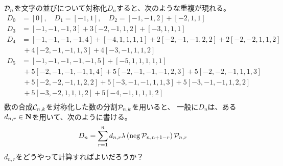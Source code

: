 {\begin{todo}[符号の対称化]\label{todo:符号の対称化} %
	${\mathcal{D}}_n$を文字の並びについて対称化$D_n$すると、次のような重複が現れる。
	\begin{equation*}\begin{split}
D_0 &= [0],\quad D_1 = [-1, 1],\quad D_2 = [-1, -1, 2] + [-2, 1, 1] \\
D_3 &= [-1, -1, -1, 3] + 3[-2, -1, 1, 2] + [-3, 1, 1, 1] \\
D_4 &= [-1, -1, -1, -1, 4] + [-4, 1, 1, 1, 1]
	+ 2[-2, -1, -1, 2, 2] + 2[-2, -2, 1, 1, 2] \\
&\,+ 4[-2, -1, -1, 1, 3] + 4[-3, -1, 1, 1, 2] \\
D_5 &= [-1, -1, -1, -1, -1, 5] + [-5, 1, 1, 1, 1, 1] \\
&\,+ 5[-2, -1, -1, -1, 1, 4] + 5[-2, -1, -1, -1, 2, 3] + 5[-2, -2, -1, 1, 1, 3] \\
&\,+ 5[-2, -2, -1, 1, 2, 2] + 5[-3, -1, -1, 1, 1, 3] + 5[-3, -1, -1, 1, 2, 2] \\
&\,+ 5[-3, -2, 1, 1, 1, 2] + 5[-4, -1, 1, 1, 1, 2] \\
	\end{split}\end{equation*}
	数の合成${\mathcal{C}}_{n,k}$を対称化した数の分割${\mathcal{P}}_{n,k}$を用いると、
	一般に$D_n$は、ある$d_{n,r}\in\mathbf{N}$を用いて、次のように書ける。
	\begin{equation*}\begin{split}
		D_n = \sum_{r=1}^n d_{n,r} \lambda\mathinner{({{\mathinner{\operatorname{neg}}}\,{\mathcal{P}}_{n,n+1-r}})}{\mathcal{P}}_{n,r}
	\end{split}\end{equation*}
	$d_{n,r}$をどうやって計算すればよいだろうか？\EOP
\end{todo} %
%
}\endgroup %
